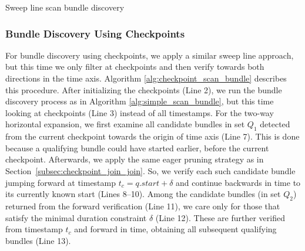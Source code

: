 \begin{algorithm}[ht!]
\begin{footnotesize}
    \vspace{4pt}
    \end{footnotesize}
    \caption{Sweep line scan bundle discovery}
    \label{alg:simple_scan_bundle}
\end{algorithm}

\subsubsection{Bundle Discovery Using Checkpoints}
\label{sec:checkpoint_join_bundle}
For bundle discovery using checkpoints, we apply a similar sweep line approach, but this time we only filter at checkpoints and then verify towards both directions in the time axis. Algorithm \ref{alg:checkpoint_scan_bundle} describes this procedure. After initializing the checkpoints (Line 2), we run the bundle discovery process as in Algorithm \ref{alg:simple_scan_bundle}, but this time looking at checkpoints (Line 3) instead of all timestamps. For the two-way horizontal expansion, we first examine all candidate bundles in set $Q_1$ detected from the current checkpoint towards the origin of time axis (Line 7). This is done because a qualifying bundle could have started earlier, before the current checkpoint. Afterwards, we apply the same eager pruning strategy as in Section~\ref{subsec:checkpoint_join_join}. So, we verify each such candidate bundle jumping forward at timestamp $t_c = q.start + \delta$ and continue backwards in time to its currently known start (Lines 8--10). Among the candidate bundles (in set $Q_2$) returned from the forward verification (Line 11), we care only for those that satisfy the minimal duration constraint $\delta$ (Line 12). These are further verified from timestamp $t_c$ and forward in time, obtaining all subsequent qualifying bundles (Line 13).

